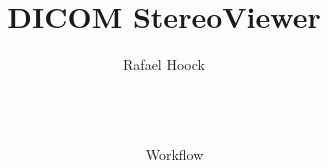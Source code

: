 \documentclass[final,hyperref={pdfpagelabels=false}]{beamer}
\title{\huge DICOM StereoViewer}
\author{Rafael Hoock}
\institute{Fachbereich Informatik und Mikrosystemtechnik}
\begin{document}

\begin{frame}[t] %





\begin{columns}[t] %

\begin{column}{.025\textwidth}\end{column} %

\begin{column}{.465\textwidth} %


\begin{block}{Workflow}


\end{block}
\end{column}
\end{columns}
\end{frame}
\end{document}
